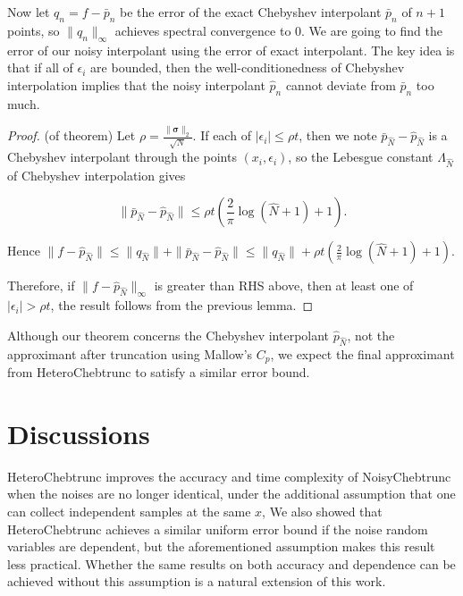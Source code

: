 \documentclass[pdflatex,sn-mathphys-num]{sn-jnl}%
\theoremstyle{thmstyleone}%
\theoremstyle{thmstyletwo}%
\theoremstyle{thmstylethree}%
\begin{document}
Now let $q_n = f - \bar{p}_n$ be the error of the exact Chebyshev interpolant $\bar{p}_n$ of $n+1$ points, so $\|q_n\|_\infty $ achieves spectral convergence to 0. We are going to find the error of our noisy interpolant using the error of exact interpolant. The key idea is that if all of $\epsilon_i$ are bounded, then the well-conditionedness of Chebyshev interpolation implies that the noisy interpolant $\hat{p}_n$ cannot deviate from $\bar{p}_n$ too much. 


\begin{proof}(of theorem)
	Let $\rho = \frac{\|\bm{\sigma}\|_2}{\sqrt{N}}$. If each of $|\epsilon_i| \leq \rho t$, then we note $\bar{p}_{\hat{N}} - \hat{p}_{\hat{N}}$ is a Chebyshev interpolant through the points $(x_i, \epsilon_i)$, so the Lebesgue constant $\Lambda_{\hat{N}}$ of Chebyshev interpolation gives
	
	\[\|\bar{p}_{\hat{N}} - \hat{p}_{\hat{N}}\| \leq \rho t(\frac{2}{\pi} \log (\hat{N}+1) +1). \]
	
	Hence $\|f-\hat{p}_{\hat{N}} \| \leq \|q_{\hat{N}}\| + \|\bar{p}_{\hat{N}} - \hat{p}_{\hat{N}}\| \leq \|q_{\hat{N}}\|+ \rho t(\frac{2}{\pi} \log (\hat{N}+1) +1).$
	
	Therefore, if $\|f-\hat{p}_{\hat{N}}\|_\infty $ is greater than RHS above, then at least one of $|\epsilon_i| > \rho t$, the result follows from the previous lemma.
	
\end{proof}

Although our theorem concerns the Chebyshev interpolant $\hat{p}_{\hat{N}}$, not the approximant after truncation using Mallow's $C_p$, we expect the final approximant from HeteroChebtrunc to satisfy a similar error bound.



\section{Discussions}


HeteroChebtrunc improves the accuracy and time complexity of NoisyChebtrunc when the noises are no longer identical, under the additional assumption that one can collect independent samples at the same $x$, We also showed that HeteroChebtrunc achieves a similar uniform error bound if the noise random variables are dependent, but the aforementioned assumption makes this result less practical. Whether the same results on both accuracy and dependence can be achieved without this assumption is a natural extension of this work.
\end{document}
